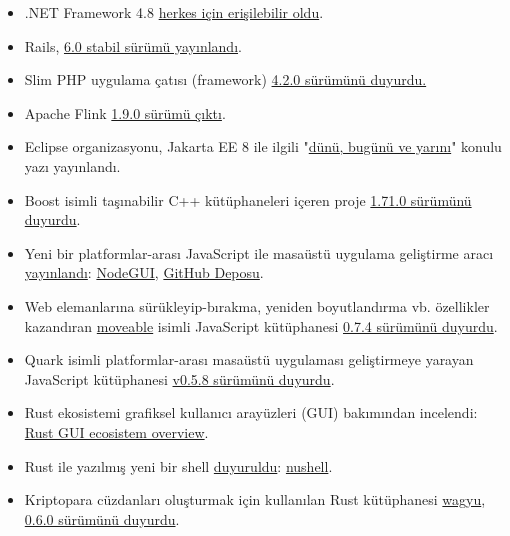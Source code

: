 \documentclass[11pt]{article}
\begin{document}
\begin{itemize}
\item .NET Framework 4.8 \href{https://devblogs.microsoft.com/dotnet/net-framework-4-8-is-available-on-windows-update-wsus-and-mu-catalog/}{herkes için erişilebilir oldu}.
\item Rails, \href{https://weblog.rubyonrails.org/2019/8/15/Rails-6-0-final-release/}{6.0 stabil sürümü yayınlandı}.
\item Slim PHP uygulama çatısı (framework) \href{http://www.slimframework.com/2019/08/20/slim-4.2.0-release.html}{4.2.0 sürümünü duyurdu.}
\item Apache Flink \href{https://flink.apache.org/news/2019/08/22/release-1.9.0.html}{1.9.0 sürümü çıktı}.
\item Eclipse organizasyonu, Jakarta EE 8 ile ilgili "\href{https://www.eclipse.org/community/eclipse\_newsletter/2019/august/jakartaee8.php}{dünü, bugünü ve yarını}"
konulu yazı yayınlandı.
\item Boost isimli taşınabilir C++ kütüphaneleri içeren proje \href{https://www.boost.org/users/history/version\_1\_71\_0.html}{1.71.0 sürümünü
duyurdu}.
\item Yeni bir platformlar-arası JavaScript ile masaüstü uygulama geliştirme aracı
\href{https://blog.atulr.com/nodegui-intro/}{yayınlandı}: \href{https://nodegui.github.io/nodegui/}{NodeGUI}, \href{https://github.com/nodegui/nodegui}{GitHub Deposu}.
\item Web elemanlarına sürükleyip-bırakma, yeniden boyutlandırma vb. özellikler
kazandıran \href{https://daybrush.com/moveable}{moveable} isimli JavaScript kütüphanesi \href{https://github.com/daybrush/moveable/releases/tag/0.7.5}{0.7.4 sürümünü duyurdu}.
\item Quark isimli platformlar-arası masaüstü uygulaması geliştirmeye yarayan
JavaScript kütüphanesi \href{https://github.com/Nishkalkashyap/Quark-electron/releases/tag/v0.5.8}{v0.5.8 sürümünü duyurdu}.
\item Rust ekosistemi grafiksel kullanıcı arayüzleri (GUI) bakımından incelendi:
\href{https://gitlab.com/z0mbie42/rust\_gui\_ecosystem\_overview}{Rust GUI ecosistem overview}.
\item Rust ile yazılmış yeni bir shell \href{https://www.jonathanturner.org/2019/08/introducing-nushell.html}{duyuruldu}: \href{https://github.com/nushell/nushell}{nushell}.
\item Kriptopara cüzdanları oluşturmak için kullanılan Rust kütüphanesi \href{https://github.com/ArgusHQ/wagyu/}{wagyu},
\href{https://github.com/ArgusHQ/wagyu/releases/tag/v0.6.0}{0.6.0 sürümünü duyurdu}.

\end{itemize}
\end{document}
